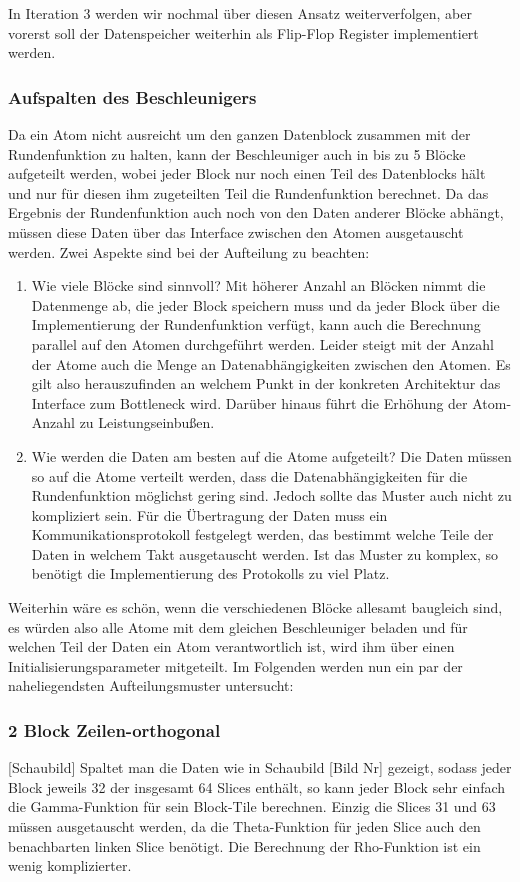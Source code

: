 In Iteration 3 werden wir nochmal über diesen Ansatz weiterverfolgen, aber vorerst soll der Datenspeicher weiterhin als Flip-Flop Register implementiert werden.

\subsubsection{Aufspalten des Beschleunigers}
Da ein Atom nicht ausreicht um den ganzen Datenblock zusammen mit der Rundenfunktion zu halten, kann der Beschleuniger auch in bis zu 5 Blöcke aufgeteilt werden,
wobei jeder Block nur noch einen Teil des Datenblocks hält und nur für diesen ihm zugeteilten Teil die Rundenfunktion berechnet. Da das Ergebnis der Rundenfunktion
auch noch von den Daten anderer Blöcke abhängt, müssen diese Daten über das Interface zwischen den Atomen ausgetauscht werden. Zwei Aspekte sind bei der Aufteilung zu beachten:
\begin{enumerate}
    \item Wie viele Blöcke sind sinnvoll? Mit höherer Anzahl an Blöcken nimmt die Datenmenge ab, die jeder Block speichern muss und da jeder Block über die Implementierung der Rundenfunktion
    verfügt, kann auch die Berechnung parallel auf den Atomen durchgeführt werden. Leider steigt mit der Anzahl der Atome auch die Menge an Datenabhängigkeiten zwischen den Atomen.
    Es gilt also herauszufinden an welchem Punkt in der konkreten Architektur das Interface zum Bottleneck wird. Darüber hinaus führt die Erhöhung der Atom-Anzahl zu Leistungseinbußen.
    \item Wie werden die Daten am besten auf die Atome aufgeteilt? Die Daten müssen so auf die Atome verteilt werden, dass die Datenabhängigkeiten für die Rundenfunktion möglichst gering sind.
    Jedoch sollte das Muster auch nicht zu kompliziert sein. Für die Übertragung der Daten muss ein Kommunikationsprotokoll festgelegt werden, das bestimmt welche Teile der Daten in welchem Takt ausgetauscht werden.
    Ist das Muster zu komplex, so benötigt die Implementierung des Protokolls zu viel Platz.
\end{enumerate}

Weiterhin wäre es schön, wenn die verschiedenen Blöcke allesamt baugleich sind, es würden also alle Atome mit dem gleichen Beschleuniger beladen und für welchen Teil der Daten ein Atom verantwortlich ist,
wird ihm über einen Initialisierungsparameter mitgeteilt. Im Folgenden werden nun ein par der naheliegendsten Aufteilungsmuster untersucht:

\subsubsection{2 Block Zeilen-orthogonal}
[Schaubild]
Spaltet man die Daten wie in Schaubild [Bild Nr] gezeigt, sodass jeder Block jeweils 32 der insgesamt 64 Slices enthält, so kann jeder Block sehr einfach die Gamma-Funktion für sein Block-Tile berechnen.
Einzig die Slices 31 und 63 müssen ausgetauscht werden, da die Theta-Funktion für jeden Slice auch den benachbarten linken Slice benötigt.
Die Berechnung der Rho-Funktion ist ein wenig komplizierter. 

